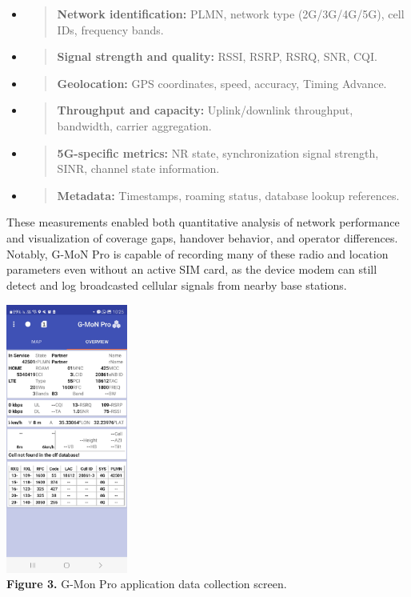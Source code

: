 \documentclass[11pt]{article}
\begin{document}
\begin{itemize}
\item
  \begin{quote}
  \textbf{Network identification:} PLMN, network type (2G/3G/4G/5G),
  cell IDs, frequency bands.
  \end{quote}
\item
  \begin{quote}
  \textbf{Signal strength and quality:} RSSI, RSRP, RSRQ, SNR, CQI.
  \end{quote}
\item
  \begin{quote}
  \textbf{Geolocation:} GPS coordinates, speed, accuracy, Timing
  Advance.
  \end{quote}
\item
  \begin{quote}
  \textbf{Throughput and capacity:} Uplink/downlink throughput,
  bandwidth, carrier aggregation.
  \end{quote}
\item
  \begin{quote}
  \textbf{5G-specific metrics:} NR state, synchronization signal
  strength, SINR, channel state information.
  \end{quote}
\item
  \begin{quote}
  \textbf{Metadata:} Timestamps, roaming status, database lookup
  references.
  \end{quote}
\end{itemize}

These measurements enabled both quantitative analysis of network
performance and visualization of coverage gaps, handover behavior, and
operator differences.
Notably, G-MoN Pro is capable of recording many of these radio and location parameters even without an active SIM card, as the device modem can still detect and log broadcasted cellular signals from nearby base stations.

\includegraphics[width=1.56771in,height=3.49541in]{figures/media/gmonImage.png}\\
\textbf{Figure 3.} G-Mon Pro application data collection screen.
\end{document}
